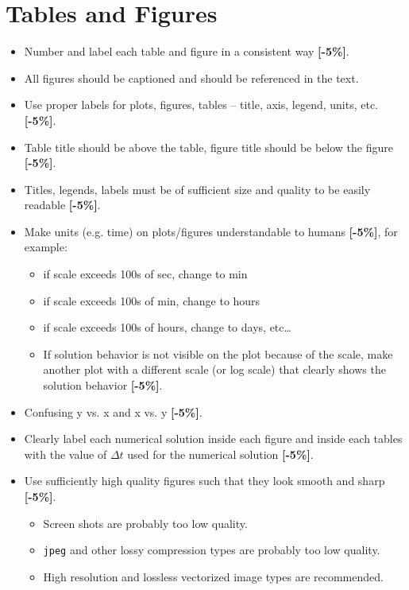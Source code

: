 \documentclass{article}
\begin{document}
\section{Tables and Figures}
\begin{itemize}
        \item Number and label each table and figure in a consistent way  {\color{red}\textbf{[-5\%]}}.
        \item All figures should be captioned and should be referenced in the 
                text. 
        \item    Use proper labels for plots, figures, tables – title, axis, legend, units, 
etc.  {\color{red}\textbf{[-5\%]}}.
\item   Table title should be above the table, figure title should be below the 
figure  {\color{red}\textbf{[-5\%]}}.
\item   Titles, legends, labels must be of sufficient size and quality to be 
easily readable  {\color{red}\textbf{[-5\%]}}.
\item    Make units (e.g. time) on plots/figures understandable to humans  {\color{red}\textbf{[-5\%]}}, 
for example:
\begin{itemize}
        \item   if scale exceeds 100s of sec, change to min
        \item   if scale exceeds 100s of min, change to hours
        \item   if scale exceeds 100s of hours, change to days, etc…
        \item   If solution behavior is not visible on the plot because of the 
                scale, make another plot with a different scale (or log scale) 
                that clearly shows the solution behavior  {\color{red}\textbf{[-5\%]}}.
\end{itemize}
\item    Confusing y vs. x and x vs. y  {\color{red}\textbf{[-5\%]}}.
\item    Clearly label each numerical solution inside each figure and inside each 
tables with the value of $\Delta t$ used for the numerical solution  {\color{red}\textbf{[-5\%]}}.
\item    Use sufficiently high quality figures such that they look smooth and sharp 
 {\color{red}\textbf{[-5\%]}}.
\begin{itemize}
\item    Screen shots are probably too low quality.
\item   \texttt{jpeg} and other lossy compression types are probably too low quality.
\item   High resolution and lossless vectorized image types are recommended.
        \end{itemize}
        \end{itemize}
\end{document}

